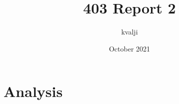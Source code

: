 \documentclass{article}
\title{403 Report 2}
\author{kvalji }
\date{October 2021}
\begin{document}
\maketitle
\section{Analysis}
\end{document}
